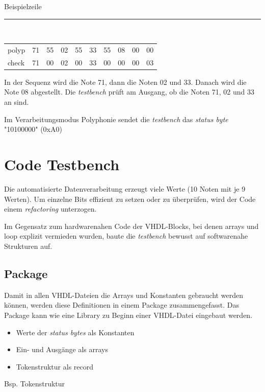 Beispielzeile\\
\rule{\textwidth}{0.4pt}\\
{
\renewcommand{\arraystretch}{1.0} %
\begin{tabular*}{\textwidth}{@{}@{\extracolsep{\fill}}*{10}{l}@{}} %
polyp & 71 & 55 & 02 & 55 & 33 & 55 & 08 & 00 & 00\\
check & 71 & 00 & 02 & 00 & 33 & 00 & 00 & 00 & 03
\end{tabular*}
}

In der Sequenz wird die Note 71, dann die Noten 02 und 33. Danach wird die Note 08 abgestellt. Die \textit{testbench} prüft am Ausgang, ob die Noten 71, 02 und 33 an sind. 

Im Verarbeitungsmodus Polyphonie sendet die \textit{testbench}  das \textit{status byte} "10100000" (0xA0) 



\section{Code Testbench}\label{sec.code_testbench}

Die automatisierte Datenverarbeitung erzeugt viele Werte (10 Noten mit je 9 Werten). Um einzelne Bits effizient zu setzen oder zu überprüfen, wird der Code einem \textit{refactoring} unterzogen.

Im Gegensatz zum hardwarenahen Code der VHDL-Blocks, bei denen arrays und loop explizit vermieden wurden, baute die \textit{testbench} bewusst auf softwarenahe Strukturen auf.

\subsection{Package}

Damit in allen VHDL-Dateien die Arrays und Konstanten gebraucht werden können, werden diese Definitionen in einem Package zusammengefasst. Das Package kann wie eine Library zu Beginn einer VHDL-Datei eingebaut werden.
\begin{itemize}
	\item Werte der \textit{status bytes} als Konstanten
	\item Ein- und Ausgänge als arrays
	\item Tokenstruktur als record
\end{itemize}

Bsp. Tokenstruktur

